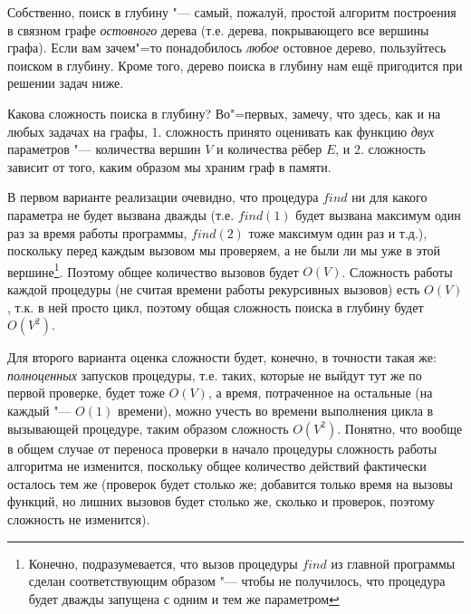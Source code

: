 Собственно, поиск в глубину "--- самый, пожалуй, простой алгоритм построения в связном графе 
\textit{остовного} дерева (т.е. дерева, покрывающего все вершины графа). Если вам зачем"=то 
понадобилось \textit{любое} остовное дерево, пользуйтесь поиском в глубину. Кроме того, дерево 
поиска в глубину нам ещё пригодится при решении задач ниже.

Какова сложность поиска в глубину? Во"=первых, замечу, что здесь, как и на любых задачах на графы, 
1. сложность принято оценивать как функцию \textit{двух} параметров "--- количества вершин $V$ и 
количества рёбер $E$, и 2. сложность зависит от того, каким образом мы храним граф в памяти.

В первом варианте реализации очевидно, что процедура $find$ ни для какого параметра не будет 
вызвана дважды (т.е. $find(1)$ будет вызвана максимум один раз за время работы программы, $find(2)$ 
тоже максимум один раз и т.д.), поскольку перед каждым вызовом мы проверяем, а не были ли мы уже в этой 
вершине\footnote{Конечно, подразумевается, что вызов процедуры $find$ из главной программы сделан 
соответствующим образом "--- чтобы не получилось, что процедура будет дважды запущена с одним и тем 
же параметром}. Поэтому общее количество вызовов будет $O(V)$. Сложность работы каждой процедуры 
(не считая времени работы рекурсивных вызовов) есть $O(V)$, т.к. в ней просто цикл, поэтому общая 
сложность поиска в глубину будет $O(V^2)$. 

Для второго варианта оценка сложности будет, конечно, в точности такая же: \textit{полноценных} 
запусков процедуры, т.е. таких, которые не выйдут тут же по первой проверке, будет тоже $O(V)$, а 
время, потраченное на остальные (на каждый "--- $O(1)$ времени), можно учесть во времени выполнения 
цикла в вызывающей процедуре, таким образом сложность $O(V^2)$. Понятно, что вообще в общем случае 
от переноса проверки в начало процедуры сложность работы алгоритма не изменится, поскольку общее 
количество действий фактически осталось тем же (проверок будет столько же; добавится только время 
на вызовы функций, но лишних вызовов будет столько же, сколько и проверок, поэтому сложность не 
изменится).

